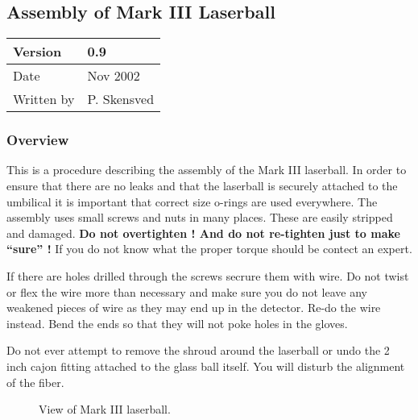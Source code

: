 \newpage

\subsection{Assembly of Mark III Laserball}
  
\begin{center}
\begin{tabular}{|l|l|}
\hline
Version    & 0.9 \\
\hline
Date       & Nov 2002\\
\hline
Written by & P. Skensved\\
\hline
\end{tabular}
\end{center}
 
\subsubsection{Overview}

  This is a procedure describing the assembly of the
Mark III laserball. In order to ensure that there are no leaks and
that the laserball is securely attached to the umbilical
it is important that correct size o-rings are used everywhere. The
assembly uses small screws and nuts in many places. These are easily
stripped and damaged. {\bf Do not overtighten ! And do not re-tighten
just to make ``sure'' !}  If you do not know what the proper torque 
should be contect an expert. 

  If there are holes drilled through the screws secrure them with wire.
Do not twist or flex the wire more than necessary and make sure you do not
leave any weakened pieces of wire  as
they may end up in the detector. Re-do the wire instead. Bend the ends so
that they will not poke holes in the gloves.

  Do not ever attempt to remove the shroud around the laserball or undo
the 2 inch cajon fitting attached to the glass ball itself. You will disturb
the alignment of the fiber. 

\begin{figure}[p]
\begin{center}
\leavevmode
\epsfxsize=6.0in
\caption[View of Mark III laserball]{
  View of Mark III laserball.
  }
\end{center}
\end{figure}


